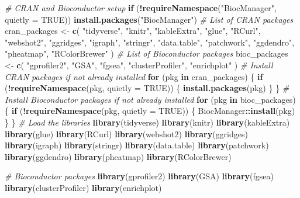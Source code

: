 \documentclass[
]{book}
\newenvironment{Shaded}{\begin{snugshade}}{\end{snugshade}}
\newcommand{\AttributeTok}[1]{\textcolor[rgb]{0.13,0.29,0.53}{#1}}
\newcommand{\CommentTok}[1]{\textcolor[rgb]{0.56,0.35,0.01}{\textit{#1}}}
\newcommand{\ConstantTok}[1]{\textcolor[rgb]{0.56,0.35,0.01}{#1}}
\newcommand{\ControlFlowTok}[1]{\textcolor[rgb]{0.13,0.29,0.53}{\textbf{#1}}}
\newcommand{\FunctionTok}[1]{\textcolor[rgb]{0.13,0.29,0.53}{\textbf{#1}}}
\newcommand{\NormalTok}[1]{#1}
\newcommand{\OtherTok}[1]{\textcolor[rgb]{0.56,0.35,0.01}{#1}}
\newcommand{\SpecialCharTok}[1]{\textcolor[rgb]{0.81,0.36,0.00}{\textbf{#1}}}
\newcommand{\StringTok}[1]{\textcolor[rgb]{0.31,0.60,0.02}{#1}}
\begin{document}
\begin{Shaded}
\begin{Highlighting}[]
\CommentTok{\# CRAN and Bioconductor setup}
\ControlFlowTok{if}\NormalTok{ (}\SpecialCharTok{!}\FunctionTok{requireNamespace}\NormalTok{(}\StringTok{"BiocManager"}\NormalTok{, }\AttributeTok{quietly =} \ConstantTok{TRUE}\NormalTok{))}
  \FunctionTok{install.packages}\NormalTok{(}\StringTok{"BiocManager"}\NormalTok{)}
\CommentTok{\# List of CRAN packages}
\NormalTok{cran\_packages }\OtherTok{\textless{}{-}} \FunctionTok{c}\NormalTok{(}
  \StringTok{"tidyverse"}\NormalTok{,}
  \StringTok{"knitr"}\NormalTok{,}
  \StringTok{"kableExtra"}\NormalTok{,}
  \StringTok{"glue"}\NormalTok{,}
  \StringTok{"RCurl"}\NormalTok{,}
  \StringTok{"webshot2"}\NormalTok{,}
  \StringTok{"ggridges"}\NormalTok{,}
  \StringTok{"igraph"}\NormalTok{,}
  \StringTok{"stringr"}\NormalTok{,}
  \StringTok{"data.table"}\NormalTok{,}
  \StringTok{"patchwork"}\NormalTok{,}
  \StringTok{"ggdendro"}\NormalTok{,}
  \StringTok{"pheatmap"}\NormalTok{,}
  \StringTok{"RColorBrewer"}
\NormalTok{)}
\CommentTok{\# List of Bioconductor packages}
\NormalTok{bioc\_packages }\OtherTok{\textless{}{-}} \FunctionTok{c}\NormalTok{(}
  \StringTok{"gprofiler2"}\NormalTok{,}
  \StringTok{"GSA"}\NormalTok{,}
  \StringTok{"fgsea"}\NormalTok{,}
  \StringTok{"clusterProfiler"}\NormalTok{,}
  \StringTok{"enrichplot"}
\NormalTok{) }
\CommentTok{\# Install CRAN packages if not already installed}
\ControlFlowTok{for}\NormalTok{ (pkg }\ControlFlowTok{in}\NormalTok{ cran\_packages) \{}
  \ControlFlowTok{if}\NormalTok{ (}\SpecialCharTok{!}\FunctionTok{requireNamespace}\NormalTok{(pkg, }\AttributeTok{quietly =} \ConstantTok{TRUE}\NormalTok{)) \{}
    \FunctionTok{install.packages}\NormalTok{(pkg)}
\NormalTok{  \}}
\NormalTok{\}}
\CommentTok{\# Install Bioconductor packages if not already installed}
\ControlFlowTok{for}\NormalTok{ (pkg }\ControlFlowTok{in}\NormalTok{ bioc\_packages) \{}
  \ControlFlowTok{if}\NormalTok{ (}\SpecialCharTok{!}\FunctionTok{requireNamespace}\NormalTok{(pkg, }\AttributeTok{quietly =} \ConstantTok{TRUE}\NormalTok{)) \{}
\NormalTok{    BiocManager}\SpecialCharTok{::}\FunctionTok{install}\NormalTok{(pkg)}
\NormalTok{  \}}
\NormalTok{\}}
\CommentTok{\# Load the libraries}
\FunctionTok{library}\NormalTok{(tidyverse)}
\FunctionTok{library}\NormalTok{(knitr)}
\FunctionTok{library}\NormalTok{(kableExtra)}
\FunctionTok{library}\NormalTok{(glue)}
\FunctionTok{library}\NormalTok{(RCurl)}
\FunctionTok{library}\NormalTok{(webshot2)}
\FunctionTok{library}\NormalTok{(ggridges)}
\FunctionTok{library}\NormalTok{(igraph)}
\FunctionTok{library}\NormalTok{(stringr)}
\FunctionTok{library}\NormalTok{(data.table)}
\FunctionTok{library}\NormalTok{(patchwork)}
\FunctionTok{library}\NormalTok{(ggdendro)}
\FunctionTok{library}\NormalTok{(pheatmap)}
\FunctionTok{library}\NormalTok{(RColorBrewer)}

\CommentTok{\# Bioconductor packages}
\FunctionTok{library}\NormalTok{(gprofiler2)}
\FunctionTok{library}\NormalTok{(GSA)}
\FunctionTok{library}\NormalTok{(fgsea)}
\FunctionTok{library}\NormalTok{(clusterProfiler)}
\FunctionTok{library}\NormalTok{(enrichplot)}
\end{Highlighting}
\end{Shaded}
\end{document}
